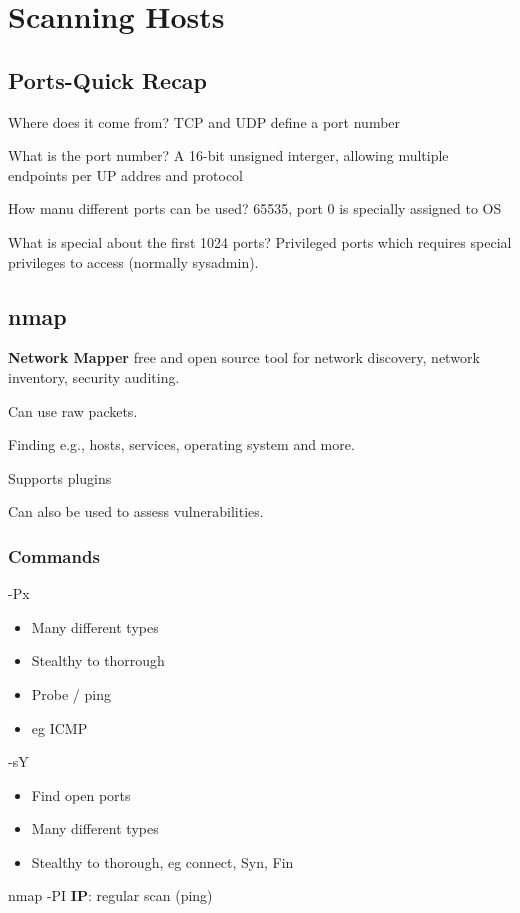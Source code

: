 \section{Scanning Hosts}

\subsection{Ports-Quick Recap}
\begin{flushleft}
Where does it come from? TCP and UDP define a port number

What is the port number? A 16-bit unsigned interger, allowing multiple endpoints per UP addres and protocol

How manu different ports can be used? 65535, port 0 is specially assigned to OS

What is special about the first 1024 ports? Privileged ports which requires special privileges to access (normally sysadmin).
\end{flushleft}

\subsection{nmap}
\begin{flushleft}
\textbf{Network Mapper}
free and open source tool for network discovery, network inventory, security auditing.

Can use raw packets.

Finding e.g., hosts, services, operating system and more.

Supports plugins

Can also be used to assess vulnerabilities.

\subsubsection{Commands}
-Px
\begin{itemize}
	\item Many different types
	\item Stealthy to thorrough
	\item Probe / ping
	\item eg ICMP
\end{itemize}

-sY
\begin{itemize}
	\item Find open ports
	\item Many different types
	\item Stealthy to thorough, eg connect, Syn, Fin
\end{itemize}

nmap -PI \textbf{IP}: regular scan (ping)
\end{flushleft}
